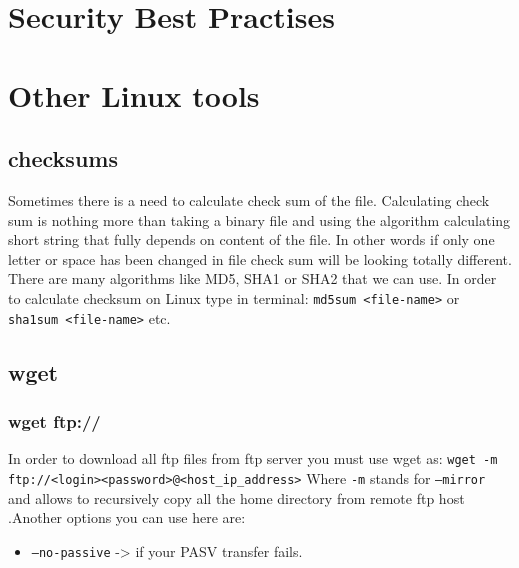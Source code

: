 \documentclass{article}[12pt]
\newcommand{\q}[1]{\texttt{#1}}
\begin{document}
\section{Security Best Practises}




\section{Other Linux tools}
\subsection{checksums}
Sometimes there is a need to calculate check sum of the file.
Calculating check sum is nothing more than taking a binary file and using the algorithm calculating short string that fully depends on content of the file.
In other words if only one letter or space has been changed in file check sum will be looking totally different.
There are many algorithms like MD5, SHA1 or SHA2 that we can use.
In order to calculate checksum on Linux type in terminal:
\texttt{md5sum <file-name>} or \texttt{sha1sum <file-name>} etc.
\subsection{wget}
\subsubsection{wget ftp://}
In order to download all ftp files from ftp server you must use wget as: \newline \newline
\q{wget -m ftp://<login><password>@<host\_ip\_address>} \newline \newline
Where \q{-m} stands for \q{--mirror} and allows to recursively copy all the home directory from remote ftp host .Another options you can use here are:
\begin{itemize}
    \item \q{--no-passive} -> if your PASV transfer fails.
\end{itemize}
\end{document}
